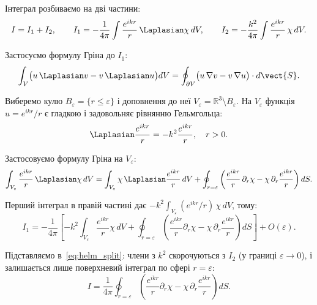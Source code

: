 Інтеграл розбиваємо на дві частини:
\begin{equation}
    I = I_1 + I_2, \qquad
    I_1 = -\frac{1}{4\pi}\int \frac{e^{ikr}}{r}\,\Laplasian\chi\, dV, \qquad
    I_2 = -\frac{k^2}{4\pi}\int \frac{e^{ikr}}{r}\,\chi\, dV.
    \label{eq:helm_split}
\end{equation}

Застосуємо формулу Гріна до \( I_1 \):
\begin{equation*}
    \int_V \bigl( u\,\Laplasian v - v\,\Laplasian u \bigr) dV
    = \oint_{\partial V} \bigl( u\,\nabla v - v\,\nabla u \bigr)\cdot d\vect{S}.
\end{equation*}

Виберемо кулю \( B_\varepsilon = \{r \leq \varepsilon\} \) і доповнення до неї \( V_\varepsilon = \mathbb{R}^3 \setminus B_\varepsilon \).
На \( V_\varepsilon \) функція \( u = e^{ikr}/r \) є гладкою і задовольняє рівнянню Гельмгольца:
\begin{equation*}
    \Laplasian \frac{e^{ikr}}{r} = -k^2 \frac{e^{ikr}}{r}, \quad r > 0.
\end{equation*}

Застосовуємо формулу Гріна на \( V_\varepsilon \):
\begin{equation*}
    \int_{V_\varepsilon} \frac{e^{ikr}}{r}\,\Laplasian\chi\, dV
    = \int_{V_\varepsilon} \chi\, \Laplasian\frac{e^{ikr}}{r}\, dV
    + \oint_{r=\varepsilon} \left( \frac{e^{ikr}}{r}\,\partial_r\chi
    - \chi\,\partial_r\frac{e^{ikr}}{r} \right) dS.
\end{equation*}

Перший інтеграл в правій частині дає \( -k^2\int_{V_\varepsilon} (e^{ikr}/r)\,\chi\, dV \), тому:
\begin{equation*}
    I_1 = -\frac{1}{4\pi}\left[
        -k^2\int_{V_\varepsilon} \frac{e^{ikr}}{r}\chi\, dV
        + \oint_{r=\varepsilon} \left( \frac{e^{ikr}}{r}\partial_r\chi
        - \chi\,\partial_r\frac{e^{ikr}}{r} \right) dS
    \right] + O(\varepsilon).
\end{equation*}

Підставляємо в~\eqref{eq:helm_split}: члени з \( k^2 \) скорочуються з \( I_2 \) (у границі \( \varepsilon \to 0 \)), і залишається лише поверхневий
інтеграл по сфері \( r = \varepsilon \):
\begin{equation*}
    I = \frac{1}{4\pi}\oint_{r=\varepsilon}\left(
        \frac{e^{ikr}}{r}\partial_r\chi - \chi\,\partial_r\frac{e^{ikr}}{r}
    \right) dS.
\end{equation*}

